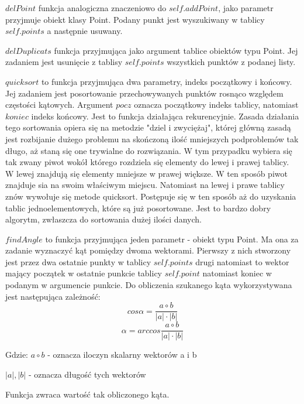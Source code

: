 $delPoint$ funkcja analogiczna znaczeniowo do $self.addPoint$, jako parametr przyjmuje obiekt klasy Point. Podany punkt jest wyszukiwany w tablicy $self.points$ a następnie usuwany.

$delDuplicats$ funkcja przyjmująca jako argument tablice obiektów typu Point. Jej zadaniem jest usunięcie z tablisy $self.points$ wszystkich punktów z podanej listy.

$quicksort$ to funkcja przyjmująca dwa parametry, indeks początkowy i końcowy. Jej zadaniem jest posortowanie przechowywanych punktów rosnąco względem częstości kątowych. Argument $pocz$ oznacza początkowy indeks tablicy, natomiast $koniec$ indeks końcowy. Jest to funkcja działająca rekurencyjnie. Zasada działania tego sortowania opiera się na metodzie "dziel i zwyciężaj", której główną zasadą jest rozbijanie dużego problemu na skończoną ilość mniejszych podproblemów tak długo, aż staną się one trywialne do rozwiązania. W tym przypadku wybiera się tak zwany piwot wokół którego rozdziela się elementy do lewej i prawej tablicy. W lewej znajdują się elementy mniejsze w prawej większe. W ten sposób piwot znajduje sia na swoim właściwym miejscu. Natomiast na lewej i prawe tablicy znów wywołuje się metode quicksort. Postępuje się w ten sposób aż do uzyskania tablic jednoelementowych, które są już posortowane. Jest to bardzo dobry algorytm, zwłaszcza do sortowania dużej ilości danych.

$findAngle$ to funkcja przyjmująca jeden parametr - obiekt typu Point. Ma ona za zadanie wyznaczyć kąt pomiędzy dwoma wektorami. Pierwszy z nich stworzony jest przez dwa ostatnie punkty w tablicy $self.points$ drugi natomiast to wektor mający początek w ostatnie punkcie tablicy $self.point$ natomiast koniec w podanym w argumencie punkcie. Do obliczenia szukanego kąta wykorzystywana jest następująca zależność:
\begin{equation}
cos \alpha = \frac{a \circ b}{|a|\cdot |b|}
\end{equation}
\begin{equation}
\alpha = arccos \frac{a \circ b}{|a|\cdot |b|}
\end{equation}

Gdzie:
$a \circ b$ - oznacza iloczyn skalarny wektorów a i b

$|a|,|b|$ - oznacza długość tych wektorów

Funkcja zwraca wartość tak obliczonego kąta.

